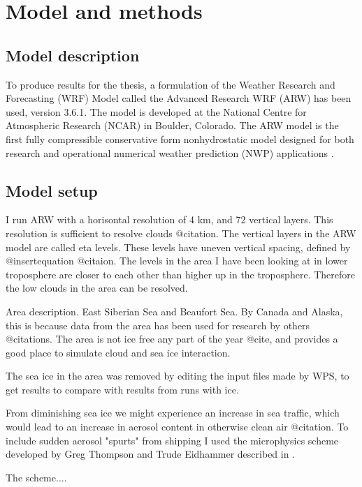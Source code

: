 \chapter{Model and methods}
\label{chaptr2}
\section{Model description}
\label{sec:modeldes}
To produce results for the thesis, a formulation of the Weather Research and Forecasting (WRF) Model called the Advanced Research WRF (ARW) has been used, version 3.6.1. The model is developed at the National Centre for Atmospheric Research (NCAR) in Boulder, Colorado. The ARW model is the first fully compressible conservative form nonhydrostatic model designed for both research and operational numerical weather prediction (NWP) applications \citep{Skamarock2008}.
\section{Model setup}
\label{sec:modelset}
I run ARW with a horisontal resolution of 4 km, and 72 vertical layers. This resolution is sufficient to resolve clouds @citation.
The vertical layers in the ARW model are called eta levels. These levels have uneven vertical spacing, defined by @insertequation @citaion. The levels in the area I have been looking at in lower troposphere are closer to each other than higher up in the troposphere. Therefore the low clouds in the area can be resolved.

Area description. East Siberian Sea and Beaufort Sea. By Canada and Alaska, this is because data from the area has been used for research by others @citations. The area is not ice free any part of the year @cite, and provides a good place to simulate cloud and sea ice interaction.

The sea ice in the area was removed by editing the input files made by WPS, to get results to compare with results from runs with ice.

From diminishing sea ice we might experience an increase in sea traffic, which would lead to an increase in aerosol content in otherwise clean air @citation. To include sudden aerosol "spurts" from shipping I used the microphysics scheme developed by Greg Thompson and Trude Eidhammer described in \cite{Thompson2014}.

The scheme....
